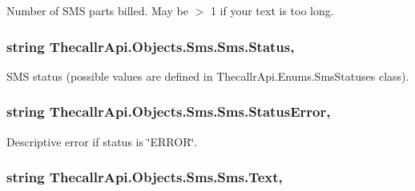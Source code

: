 Number of S\+M\+S parts billed. May be $>$ 1 if your text is too long. 

\hypertarget{class_thecallr_api_1_1_objects_1_1_sms_1_1_sms_a5696eacf0b2b71e0e57ac1d5d8f4c5d5}{
\subsubsection[{Status}]{\setlength{\rightskip}{0pt plus 5cm}string Thecallr\+Api.\+Objects.\+Sms.\+Sms.\+Status\hspace{0.3cm}{\ttfamily [get]}, {\ttfamily [set]}}}\label{class_thecallr_api_1_1_objects_1_1_sms_1_1_sms_a5696eacf0b2b71e0e57ac1d5d8f4c5d5}


S\+M\+S status (possible values are defined in Thecallr\+Api.\+Enums.\+Sms\+Statuses class). 

\hypertarget{class_thecallr_api_1_1_objects_1_1_sms_1_1_sms_a86b7454de956bf5f0ffb7408acfe0451}{
\subsubsection[{Status\+Error}]{\setlength{\rightskip}{0pt plus 5cm}string Thecallr\+Api.\+Objects.\+Sms.\+Sms.\+Status\+Error\hspace{0.3cm}{\ttfamily [get]}, {\ttfamily [set]}}}\label{class_thecallr_api_1_1_objects_1_1_sms_1_1_sms_a86b7454de956bf5f0ffb7408acfe0451}


Descriptive error if status is \char`\"{}\+E\+R\+R\+O\+R\char`\"{}. 

\hypertarget{class_thecallr_api_1_1_objects_1_1_sms_1_1_sms_a64da1b9a01370e919f60889bf2e057eb}{
\subsubsection[{Text}]{\setlength{\rightskip}{0pt plus 5cm}string Thecallr\+Api.\+Objects.\+Sms.\+Sms.\+Text\hspace{0.3cm}{\ttfamily [get]}, {\ttfamily [set]}}}\label{class_thecallr_api_1_1_objects_1_1_sms_1_1_sms_a64da1b9a01370e919f60889bf2e057eb}


